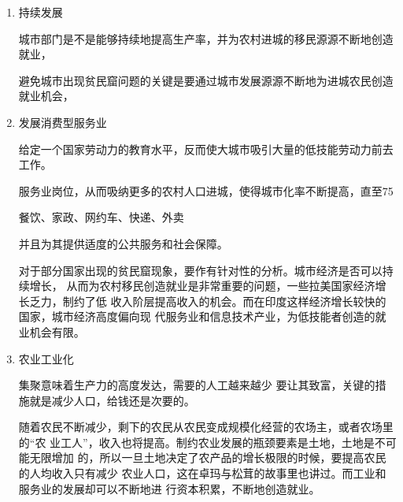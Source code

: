 \begin{enumerate}
  结合现实状况（\footnote{不能结合现实的政策提案，有什么用呢？}，其所要求的是什么？
  中央承担全民社会保障，以“自愿、有就业、有社会保障、土地（或建设用地指标

  （“资本家不愿做的事，政府也不愿做”，为什么不让资本家去做呢？因为外部性？
  可实际上在历史经验及现实情况下，前者是政府的持续赤字，后者是太过乐观——政
  府的无能为力（包括美国））

  地价和房价本身就成为低效率企业和劳动力进入大城市的障碍，这就是市场的力量。

\item 持续发展


城市部门是不是能够持续地提高生产率，并为农村进城的移民源源不断地创造就业，


避免城市出现贫民窟问题的关键是要通过城市发展源源不断地为进城农民创造就业机会，

\item 发展消费型服务业

  给定一个国家劳动力的教育水平，反而使大城市吸引大量的低技能劳动力前去工作。


  服务业岗位，从而吸纳更多的农村人口进城，使得城市化率不断提高，直至75%

  餐饮、家政、网约车、快递、外卖


  并且为其提供适度的公共服务和社会保障。

  对于部分国家出现的贫民窟现象，要作有针对性的分析。城市经济是否可以持续增长，
  从而为农村移民创造就业是非常重要的问题，一些拉美国家经济增长乏力，制约了低
  收入阶层提高收入的机会。而在印度这样经济增长较快的国家，城市经济高度偏向现
  代服务业和信息技术产业，为低技能者创造的就业机会有限。


\item 农业工业化

  集聚意味着生产力的高度发达，需要的人工越来越少
  要让其致富，关键的措施就是减少人口，给钱还是次要的。

  随着农民不断减少，剩下的农民从农民变成规模化经营的农场主，或者农场里的“农
  业工人”，收入也将提高。制约农业发展的瓶颈要素是土地，土地是不可能无限增加
  的，所以一旦土地决定了农产品的增长极限的时候，要提高农民的人均收入只有减少
  农业人口，这在卓玛与松茸的故事里也讲过。而工业和服务业的发展却可以不断地进
  行资本积累，不断地创造就业。

\end{enumerate}



